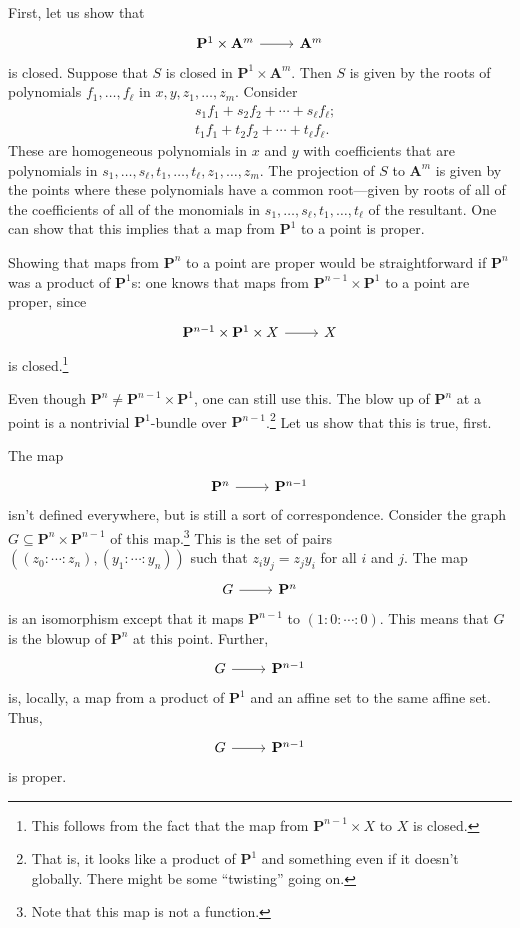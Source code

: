 \documentclass [11 pt, oneside] {article}
\begin{document}
First, let us show that 
\[
\begin{tikzcd}
\mathbf{P}^1\times \mathbf{A}^m\ar[r]& \mathbf{A}^m
\end{tikzcd}
\]
is closed.
Suppose that $S$ is closed in $\mathbf{P}^1\times \mathbf{A}^m$. Then $S$ is given by the roots of polynomials $f_1,\hdots, f_\ell$ in $x,y, z_1,\hdots,z_m$. Consider 
\begin{align*}
	&s_1f_1+s_2f_2+\cdots+s_\ell f_\ell;\\
	&t_1f_1+t_2f_2+\cdots+t_\ell f_\ell.
\end{align*}
These are homogeneous polynomials in $x$ and $y$ with coefficients that are polynomials in $s_1,\hdots,s_\ell,t_1,\hdots, t_\ell,z_1,\hdots, z_m$. The projection of $S$ to $\mathbf{A}^m$ is given by the points where these polynomials have a common root---given by roots of all of the coefficients of all of the monomials in $s_1,\hdots,s_\ell,t_1,\hdots, t_\ell$ of the resultant. One can show that this implies that a map from $\mathbf{P}^1$ to a point is proper.

Showing that maps from $\mathbf{P}^n$ to a point are proper would be straightforward if $\mathbf{P}^n$ was a product of $\mathbf{P}^1$s: one knows that maps from $\mathbf{P}^{n-1}\times \mathbf{P}^1$ to a point are proper, since
\[
\begin{tikzcd}
\mathbf{P}^{n-1} \times \mathbf{P}^1\times X\ar[r]& X
\end{tikzcd}
\]
is closed.\footnote{This follows from the fact that the map from $\mathbf{P}^{n-1}\times X$ to $X$ is closed.}

Even though $\mathbf{P}^n\ne \mathbf{P}^{n-1}\times \mathbf{P}^1$, one can still use this. The blow up of $\mathbf{P}^n$ at a point is a nontrivial $\mathbf{P}^1$-bundle over $\mathbf{P}^{n-1}$.\footnote{That is, it looks like a product of $\mathbf{P}^1$ and something even if it doesn't globally. There might be some ``twisting'' going on.} Let us show that this is true, first.

The map 
\[
\begin{tikzcd}
\mathbf{P}^{n}\ar[r]& \mathbf{P}^{n-1}
\end{tikzcd}
\]
isn't defined everywhere, but is still a sort of correspondence. Consider the graph $G\subseteq \mathbf{P}^n\times \mathbf{P}^{n-1}$ of this map.\footnote{Note that this map is not a function.} This is the set of pairs $((z_0:\cdots:z_n), (y_1:\cdots:y_n))$ such that $z_iy_j=z_jy_i$ for all $i$ and $j$. The map 
\[
\begin{tikzcd}
G\ar[r]& \mathbf{P}^n
\end{tikzcd}
\]
is an isomorphism except that it maps $\mathbf{P}^{n-1}$ to $(1:0:\cdots:0)$. This means that $G$ is the blowup of $\mathbf{P}^n$ at this point. Further, 
\[
\begin{tikzcd}
G\ar[r]& \mathbf{P}^{n-1}
\end{tikzcd}
\]
is, locally, a map from a product of $\mathbf{P}^1$ and an affine set to the same affine set. Thus, 
\[
\begin{tikzcd}
G\ar[r]& \mathbf{P}^{n-1}
\end{tikzcd}
\]
is proper.
\end{document}
